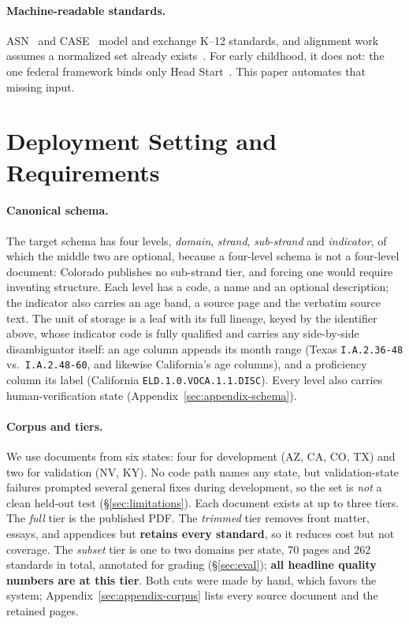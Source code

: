 \documentclass[letterpaper]{article} %
\begin{document}
\paragraph{Machine-readable standards.} ASN~\citep{sutton2008achievement} and
CASE~\citep{1edtech2017case} model and exchange K--12 standards, and alignment
work assumes a normalized set already
exists~\citep{porter2002measuring,polikoff2011howwell,devaul2011computer,xu2025automated}.
For early childhood, it does not: the one federal framework binds only Head
Start~\citep{ohs2015elof}. This paper automates that missing input.

\section{Deployment Setting and Requirements}
\label{sec:requirements}\label{sec:data}\label{sec:corpus}\label{sec:schema}

\paragraph{Canonical schema.} The target schema has four levels,
\emph{domain}, \emph{strand}, \emph{sub-strand} and \emph{indicator}, of which
the middle two are optional, because a four-level schema is not a four-level
document: Colorado publishes no sub-strand tier, and forcing one would require
inventing structure. Each level has a code, a name and an optional
description; the indicator also carries an age band, a source page and the
verbatim source text. The unit of storage is a leaf with its full lineage,
keyed by the identifier above, whose indicator code is fully qualified and
carries any side-by-side disambiguator itself: an age column appends its month
range (Texas \texttt{I.A.2.36-48} vs.\ \texttt{I.A.2.48-60}, and likewise
California's age columns), and a proficiency column its label (California
\texttt{ELD.1.0.VOCA.1.1.DISC}). Every level also carries human-verification
state (Appendix~\ref{sec:appendix-schema}).

\paragraph{Corpus and tiers.} We use documents from six states: four for
development (AZ, CA, CO, TX) and two for validation (NV, KY). No code path
names any state, but validation-state failures prompted several general fixes
during development, so the set is \emph{not} a clean held-out test
(\S\ref{sec:limitations}). Each document exists at up to three tiers. The \emph{full} tier
is the published PDF. The \emph{trimmed} tier removes front matter, essays,
and appendices but \textbf{retains every standard}, so it reduces cost but not
coverage. The \emph{subset} tier is one to two domains per state, 70 pages and
262 standards in total, annotated for grading (\S\ref{sec:eval});
\textbf{all headline quality numbers are at this tier}. Both cuts were made by
hand, which favors the system; Appendix~\ref{sec:appendix-corpus} lists every
source document and the retained pages.
\end{document}
